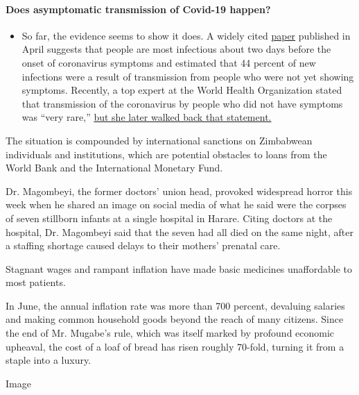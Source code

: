 \begin{itemize}
{  \paragraph{Does asymptomatic transmission of Covid-19
  happen?}\label{does-asymptomatic-transmission-of-covid-19-happen}}

  \begin{itemize}
  \tightlist
  \item
    So far, the evidence seems to show it does. A widely cited
    \href{https://www.nature.com/articles/s41591-020-0869-5}{paper}
    published in April suggests that people are most infectious about
    two days before the onset of coronavirus symptoms and estimated that
    44 percent of new infections were a result of transmission from
    people who were not yet showing symptoms. Recently, a top expert at
    the World Health Organization stated that transmission of the
    coronavirus by people who did not have symptoms was ``very rare,''
    \href{https://www.nytimes.com/2020/06/09/world/coronavirus-updates.html?action=click\&pgtype=Article\&state=default\&region=MAIN_CONTENT_3\&context=storylines_faq\#link-1f302e21}{but
    she later walked back that statement.}
  \end{itemize}
\end{itemize}

The situation is compounded by international sanctions on Zimbabwean
individuals and institutions, which are potential obstacles to loans
from the World Bank and the International Monetary Fund.

Dr. Magombeyi, the former doctors' union head, provoked widespread
horror this week when he shared an image on social media of what he said
were the corpses of seven stillborn infants at a single hospital in
Harare. Citing doctors at the hospital, Dr. Magombeyi said that the
seven had all died on the same night, after a staffing shortage caused
delays to their mothers' prenatal care.

Stagnant wages and rampant inflation have made basic medicines
unaffordable to most patients.

In June, the annual inflation rate was more than 700 percent, devaluing
salaries and making common household goods beyond the reach of many
citizens. Since the end of Mr. Mugabe's rule, which was itself marked by
profound economic upheaval, the cost of a loaf of bread has risen
roughly 70-fold, turning it from a staple into a luxury.

Image

